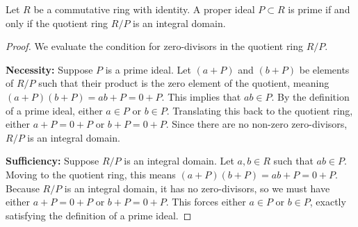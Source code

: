 \documentclass[11pt]{scrartcl}
\begin{document}
\begin{theorem}
    Let $R$ be a commutative ring with identity. A proper ideal $P \subset R$ is prime if and only if the quotient ring $R/P$ is an integral domain.
\end{theorem}
\begin{proof}
    We evaluate the condition for zero-divisors in the quotient ring $R/P$. 
    
    \textbf{Necessity:} Suppose $P$ is a prime ideal. Let $(a+P)$ and $(b+P)$ be elements of $R/P$ such that their product is the zero element of the quotient, meaning $(a+P)(b+P) = ab + P = 0 + P$. This implies that $ab \in P$. By the definition of a prime ideal, either $a \in P$ or $b \in P$. Translating this back to the quotient ring, either $a+P = 0+P$ or $b+P = 0+P$. Since there are no non-zero zero-divisors, $R/P$ is an integral domain.
    
    \textbf{Sufficiency:} Suppose $R/P$ is an integral domain. Let $a, b \in R$ such that $ab \in P$. Moving to the quotient ring, this means $(a+P)(b+P) = ab+P = 0+P$. Because $R/P$ is an integral domain, it has no zero-divisors, so we must have either $a+P = 0+P$ or $b+P = 0+P$. This forces either $a \in P$ or $b \in P$, exactly satisfying the definition of a prime ideal.
\end{proof}
\end{document}
